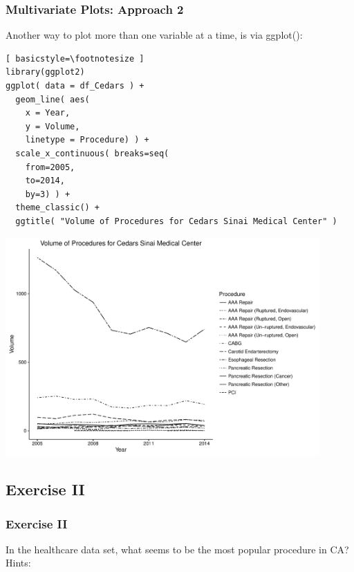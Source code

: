 \begin{frame}
 \frametitle{Multivariate Plots: Approach 2}

Another way to plot more than one variable at a time, is via \ttfamily ggplot()\normalfont :

    \begin{lstlisting}[ basicstyle=\footnotesize ]
library(ggplot2)
ggplot( data = df_Cedars ) + 
  geom_line( aes(
    x = Year, 
    y = Volume, 
    linetype = Procedure) ) +
  scale_x_continuous( breaks=seq(
    from=2005, 
    to=2014, 
    by=3) ) +
  theme_classic() +
  ggtitle( "Volume of Procedures for Cedars Sinai Medical Center" )
   \end{lstlisting}

\newpage
       \begin{center}
         \includegraphics[width=0.9\textwidth]{images/timeseries_Cedars}
        \end{center}
\end{frame}

\subsection{Exercise II}
\begin{frame}[fragile]
	\frametitle{Exercise II}
	In the healthcare data set, what seems to be the most popular procedure in CA?\\
  \vspace{10pt}
  \noindent Hints: \small


    \normalsize
\end{frame}
